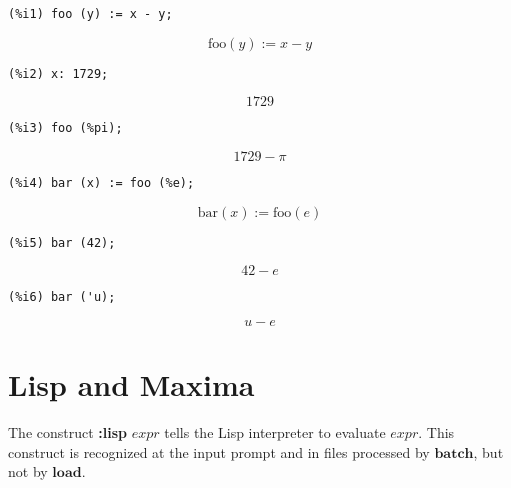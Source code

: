 \documentclass[12pt,leqno]{article}
\begin{document}
\begin{enumerate}
\begin{verbatim}
(%i1) foo (y) := x - y;
\end{verbatim}
\begin{equation}
\mathrm{foo}\left(y\right):=x-y\tag{\%o1}
\label{eq:doc-group1-code35-1-1}
\end{equation}
\begin{verbatim}
(%i2) x: 1729;
\end{verbatim}
\begin{equation}
1729\tag{\%o2}
\label{eq:doc-group1-code35-2-1}
\end{equation}
\begin{verbatim}
(%i3) foo (%pi);
\end{verbatim}
\begin{equation}
1729-\pi\tag{\%o3}
\label{eq:doc-group1-code35-3-1}
\end{equation}
\begin{verbatim}
(%i4) bar (x) := foo (%e);
\end{verbatim}
\begin{equation}
\mathrm{bar}\left(x\right):=\mathrm{foo}\left(e\right)\tag{\%o4}
\label{eq:doc-group1-code35-4-1}
\end{equation}
\begin{verbatim}
(%i5) bar (42);
\end{verbatim}
\begin{equation}
42-e\tag{\%o5}
\label{eq:doc-group1-code35-5-1}
\end{equation}
\begin{verbatim}
(%i6) bar ('u);
\end{verbatim}
\begin{equation}
u-e\tag{\%o6}
\label{eq:doc-group1-code35-6-1}
\end{equation}


\end{enumerate}

\section{Lisp and Maxima}


The construct {\bf :lisp} $\mathit{expr}$ tells the Lisp interpreter
to evaluate $\mathit{expr}$.
This construct is recognized at the input prompt and in files processed by $\mathbf{batch}$,
but not by $\mathbf{load}$.
\end{document}
